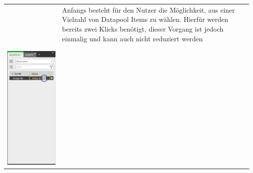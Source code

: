 \begin{longtable}[H] { c | m{5cm} }
\begin{minipage}{.25\textwidth}
    \end{minipage}
    &
   Anfangs besteht für den Nutzer die Möglichkeit, aus einer Vielzahl von Datapool Items zu wählen.
  Hierfür werden bereits zwei Klicks benötigt, dieser Vorgang ist jedoch einmalig und kann auch nicht reduziert werden
    \\ 
    \\ \hline
    \\
 \begin{minipage}{.25\textwidth}
      \includegraphics[width=\linewidth]{figures/ImageList_02.PNG}

\end{minipage}
\end{longtable}
